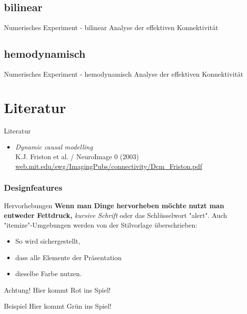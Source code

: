 \documentclass{beamer}
\begin{document}
\subsection{bilinear}
	\begin{frame}{Numerisches Experiment - bilinear}
		Analyse der effektiven Konnektivität
	\end{frame}
\subsection{hemodynamisch}
	\begin{frame}{Numerisches Experiment - hemodynamisch}
		Analyse der effektiven Konnektivität
	\end{frame}

\section{Literatur}
	\begin{frame}{Literatur}
		\begin{itemize}
			\item \textit{Dynamic causal modelling} \\ {\small K.J. Friston et al. / NeuroImage 0 (2003)} \\ {\footnotesize \url{web.mit.edu/swg/ImagingPubs/connectivity/Dcm_Friston.pdf}}
		\end{itemize}
	\end{frame}



\begin{frame}
	\frametitle{Designfeatures}
	\begin{block}{Hervorhebungen}
	 \textbf{Wenn man Dinge hervorheben möchte nutzt man entweder Fettdruck,} \textit{ kursive Schrift} \alert{ oder das Schlüsselwort "alert"}. Auch "itemize"-Umgebungen werden von der Stilvorlage überschrieben:
	\end{block}
	\pause
	\begin{itemize}
	 \item So wird sichergestellt,
	 \item dass alle Elemente der Präsentation 
	 \item dieselbe Farbe nutzen.
	\end{itemize}
	\begin{alertblock}{Achtung!}
	 Hier kommt Rot ins Spiel!	
	\end{alertblock}
	\begin{exampleblock}{Beispiel}
	 Hier kommt Grün ins Spiel!
	\end{exampleblock}
\end{frame}
\end{document}
